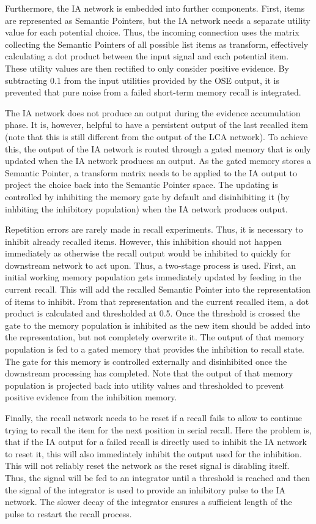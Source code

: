 Furthermore, the IA network is embedded into further components.
First, items are represented as Semantic Pointers, but the IA network needs a separate utility value for each potential choice.
Thus, the incoming connection uses the matrix collecting the Semantic Pointers of all possible list items as transform, effectively calculating a dot product between the input signal and each potential item.
These utility values are then rectified to only consider positive evidence.
By subtracting \num{0.1} from the input utilities provided by the OSE output, it is prevented that pure noise from a failed short-term memory recall is integrated.

The IA network does not produce an output during the evidence accumulation phase.
It is, however, helpful to have a persistent output of the last recalled item (note that this is still different from the output of the LCA network).
To achieve this, the output of the IA network is routed through a gated memory that is only updated when the IA network produces an output.
As the gated memory stores a Semantic Pointer, a transform matrix needs to be applied to the IA output to project the choice back into the Semantic Pointer space.
The updating is controlled by inhibiting the memory gate by default and disinhibiting it (by inhbiting the inhibitory population) when the IA network produces output.

Repetition errors are rarely made in recall experiments.
Thus, it is necessary to inhibit already recalled items.
However, this inhibition should not happen immediately as otherwise the recall output would be inhibited to quickly for downstream network to act upon.
Thus, a two-stage process is used.
First, an initial working memory population gets immediately updated by feeding in the current recall.
This will add the recalled Semantic Pointer into the representation of items to inhibit.
From that representation and the current recalled item, a dot product is calculated and thresholded at \num{0.5}.
Once the threshold is crossed the gate to the memory population is inhibited as the new item should be added into the representation, but not completely overwrite it.
The output of that memory population is fed to a gated memory that provides the inhibition to recall state.
The gate for this memory is controlled externally and disinhibited once the downstream processing has completed.
Note that the output of that memory population is projected back into utility values and thresholded to prevent positive evidence from the inhibition memory.

Finally, the recall network needs to be reset if a recall fails to allow to continue trying to recall the item for the next position in serial recall.
Here the problem is, that if the IA output for a failed recall is directly used to inhibit the IA network to reset it, this will also immediately inhibit the output used for the inhibition.
This will not reliably reset the network as the reset signal is disabling itself.
Thus, the signal will be fed to an integrator until a threshold is reached and then the signal of the integrator is used to provide an inhibitory pulse to the IA network.
The slower decay of the integrator ensures a sufficient length of the pulse to restart the recall process.
